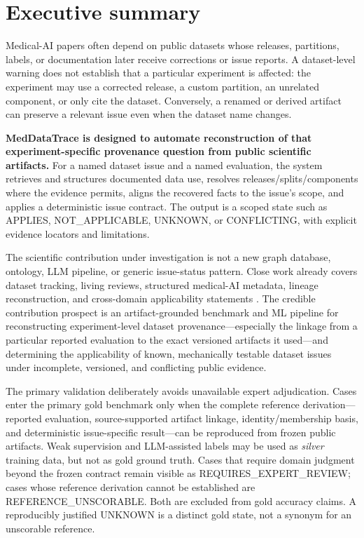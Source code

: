 \documentclass[11pt,a4paper]{article}
\newcommand{\status}[1]{\textsf{\small #1}}
\begin{document}
\section*{Executive summary}
Medical-AI papers often depend on public datasets whose releases, partitions, labels, or documentation later receive corrections or issue reports. A dataset-level warning does not establish that a particular experiment is affected: the experiment may use a corrected release, a custom partition, an unrelated component, or only cite the dataset. Conversely, a renamed or derived artifact can preserve a relevant issue even when the dataset name changes.

\textbf{MedDataTrace is designed to automate reconstruction of that experiment-specific provenance question from public scientific artifacts.} For a named dataset issue and a named evaluation, the system retrieves and structures documented data use, resolves releases/splits/components where the evidence permits, aligns the recovered facts to the issue's scope, and applies a deterministic issue contract. The output is a scoped state such as \status{APPLIES}, \status{NOT\_APPLICABLE}, \status{UNKNOWN}, or \status{CONFLICTING}, with explicit evidence locators and limitations.

The scientific contribution under investigation is not a new graph database, ontology, LLM pipeline, or generic issue-status pattern. Close work already covers dataset tracking, living reviews, structured medical-AI metadata, lineage reconstruction, and cross-domain applicability statements \cite{inthepicture2025,sourget2024,atlas,tracing2026,openvex}. The credible contribution prospect is an artifact-grounded benchmark and ML pipeline for reconstructing experiment-level dataset provenance---especially the linkage from a particular reported evaluation to the exact versioned artifacts it used---and determining the applicability of known, mechanically testable dataset issues under incomplete, versioned, and conflicting public evidence.

The primary validation deliberately avoids unavailable expert adjudication. Cases enter the primary gold benchmark only when the complete reference derivation---reported evaluation, source-supported artifact linkage, identity/membership basis, and deterministic issue-specific result---can be reproduced from frozen public artifacts. Weak supervision and LLM-assisted labels may be used as \emph{silver} training data, but not as gold ground truth. Cases that require domain judgment beyond the frozen contract remain visible as \status{REQUIRES\_EXPERT\_REVIEW}; cases whose reference derivation cannot be established are \status{REFERENCE\_UNSCORABLE}. Both are excluded from gold accuracy claims. A reproducibly justified \status{UNKNOWN} is a distinct gold state, not a synonym for an unscorable reference.
\end{document}
